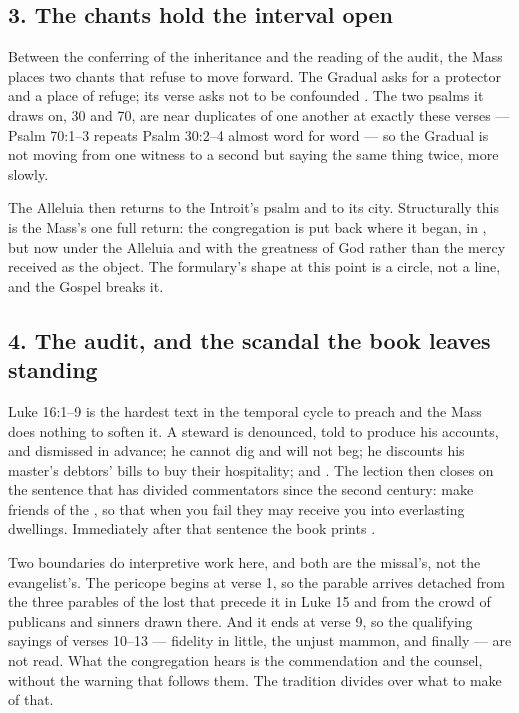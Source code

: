 \subsection*{3. The chants hold the interval open }

Between the conferring of the inheritance and the reading of the audit, the
Mass places two chants that refuse to move forward. The Gradual asks for a
protector and a place of refuge; its verse asks not to be confounded
. The two psalms it draws on, 30 and 70, are near
duplicates of one another at exactly these verses --- Psalm 70:1--3 repeats
Psalm 30:2--4 almost word for word --- so the Gradual is not moving from one
witness to a second but saying the same thing twice, more slowly.

The Alleluia then returns to the Introit's psalm and to its city.
Structurally this is the Mass's one full return: the congregation is put back
where it began, in , but now under the Alleluia
and with the greatness of God rather than the mercy received as the object.
The formulary's shape at this point is a circle, not a line, and the Gospel
breaks it.

\subsection*{4. The audit, and the scandal the book leaves standing
}

Luke 16:1--9 is the hardest text in the temporal cycle to preach and the
Mass does nothing to soften it. A steward is denounced, told to produce his
accounts, and dismissed in advance; he cannot dig and will not beg; he
discounts his master's debtors' bills to buy their hospitality; and
. The
lection then closes on the sentence that has divided commentators since the
second century: make friends of the , so that when
you fail they may receive you into everlasting dwellings. Immediately after
that sentence the book prints .

Two boundaries do interpretive work here, and both are the missal's, not the
evangelist's. The pericope begins at verse 1, so the parable arrives detached
from the three parables of the lost that precede it in Luke 15 and from the
crowd of publicans and sinners drawn there. And it ends at verse 9, so the
qualifying sayings of verses 10--13 --- fidelity in little, the unjust mammon,
and finally  --- are not read.
What the congregation hears is the commendation and the counsel, without the
warning that follows them. The tradition divides over what to make of that.

